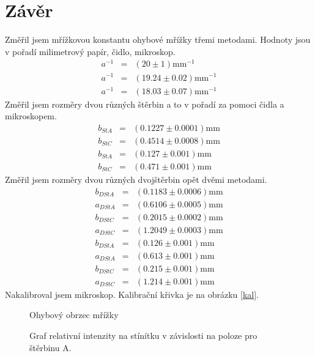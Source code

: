 \documentclass[a4paper,12pt]{article}
\begin{document}
\section{Závěr}
Změřil jsem mřížkovou konstantu ohybové mřížky třemi metodami. Hodnoty jsou v pořadí milimetrový papír, čidlo, mikroskop.
\begin{eqnarray}
a^{-1}&=&(20\pm 1)\mbox{mm}^{-1} \\
a^{-1}&=&(19.24 \pm 0.02)\mbox{mm}^{-1} \\
a^{-1}&=&(18.03 \pm 0.07)\mbox{mm}^{-1}
\end{eqnarray}
Změřil jsem rozměry dvou různých štěrbin a to v pořadí za pomoci čidla a mikroskopem.
\begin{eqnarray}
b_{StA}&=&(0.1227 \pm 0.0001) \mbox{mm}\\
b_{StC}&=&(0.4514 \pm 0.0008) \mbox{mm}\\
b_{StA}&=&(0.127 \pm 0.001) \mbox{mm}\\
b_{StC}&=&(0.471 \pm 0.001) \mbox{mm}
\end{eqnarray}
Změřil jsem rozměry dvou různých dvojštěrbin opět dvěmi metodami.
\begin{eqnarray}
b_{DStA}&=&(0.1183 \pm 0.0006) \mbox{mm}\\
a_{DStA}&=&(0.6106 \pm 0.0005) \mbox{mm}\\
b_{DStC}&=&(0.2015 \pm 0.0002) \mbox{mm}\\
a_{DStC}&=&(1.2049 \pm 0.0003) \mbox{mm}\\
b_{DStA}&=&(0.126 \pm 0.001) \mbox{mm}\\
a_{DStA}&=&(0.613 \pm 0.001) \mbox{mm}\\
b_{DStC}&=&(0.215 \pm 0.001) \mbox{mm}\\
a_{DStC}&=&(1.214 \pm 0.001) \mbox{mm}
\end{eqnarray}
Nakalibroval jsem mikroskop. Kalibrační křivka je na obrázku \ref{kal}.

\begin{figure}
\begin{center}

\end{center}
\caption{Ohybový obrzec mřížky}
\label{g1}
\end{figure}

\begin{figure}
\begin{center}

\end{center}
\caption{Graf relativní intenzity na stínítku v závislosti na poloze pro štěrbinu A.}
\label{g2}
\end{figure}
\end{document}

